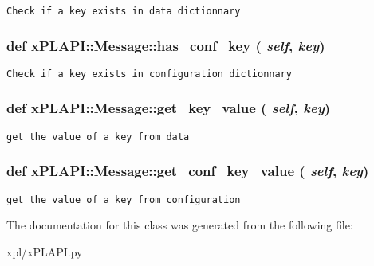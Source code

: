 \footnotesize\begin{verbatim}
Check if a key exists in data dictionnary
\end{verbatim}
\normalsize
 \hypertarget{classxPLAPI_1_1Message_8bc93e1bab48128e660be2d1e8ac7199}{
\subsubsection[has\_\-conf\_\-key]{\setlength{\rightskip}{0pt plus 5cm}def xPLAPI::Message::has\_\-conf\_\-key ( {\em self}, \/   {\em key})}}
\label{classxPLAPI_1_1Message_8bc93e1bab48128e660be2d1e8ac7199}




\footnotesize\begin{verbatim}
Check if a key exists in configuration dictionnary
\end{verbatim}
\normalsize
 \hypertarget{classxPLAPI_1_1Message_80231e4e96a2247263ed3d2bb7f9cbf3}{
\subsubsection[get\_\-key\_\-value]{\setlength{\rightskip}{0pt plus 5cm}def xPLAPI::Message::get\_\-key\_\-value ( {\em self}, \/   {\em key})}}
\label{classxPLAPI_1_1Message_80231e4e96a2247263ed3d2bb7f9cbf3}




\footnotesize\begin{verbatim}
get the value of a key from data
\end{verbatim}
\normalsize
 \hypertarget{classxPLAPI_1_1Message_de17ca84597e627ae63f9b1cf5a4b284}{
\subsubsection[get\_\-conf\_\-key\_\-value]{\setlength{\rightskip}{0pt plus 5cm}def xPLAPI::Message::get\_\-conf\_\-key\_\-value ( {\em self}, \/   {\em key})}}
\label{classxPLAPI_1_1Message_de17ca84597e627ae63f9b1cf5a4b284}




\footnotesize\begin{verbatim}
get the value of a key from configuration
\end{verbatim}
\normalsize
 

The documentation for this class was generated from the following file:\begin{CompactItemize}
\item 
xpl/xPLAPI.py\end{CompactItemize}
